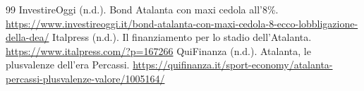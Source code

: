 \documentclass[11pt,a4paper]{article}
\begin{document}
\begin{thebibliography}{99}
 InvestireOggi (n.d.). Bond Atalanta con maxi cedola all'8\%. \url{https://www.investireoggi.it/bond-atalanta-con-maxi-cedola-8-ecco-lobbligazione-della-dea/}
 Italpress (n.d.). Il finanziamento per lo stadio dell'Atalanta. \url{https://www.italpress.com/?p=167266}
 QuiFinanza (n.d.). Atalanta, le plusvalenze dell'era Percassi. \url{https://quifinanza.it/sport-economy/atalanta-percassi-plusvalenze-valore/1005164/}
\end{thebibliography}
\end{document}
